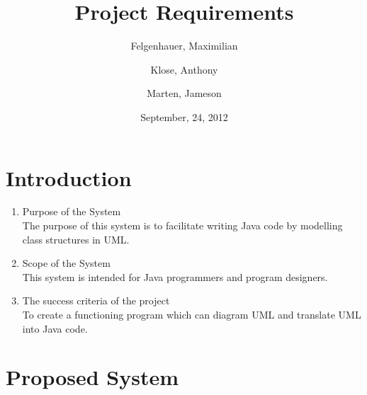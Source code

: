 \documentclass[a4paper, 12pt]{article}
\begin{document}
\title{Project Requirements}
\author{Felgenhauer, Maximilian\\
  \and
  Klose, Anthony\\
  \and
  Marten, Jameson}
\date{September, 24, 2012}

\maketitle

\section{Introduction}

\begin{enumerate}
\item{Purpose of the System}\\
  The purpose of this system is to facilitate writing Java code by modelling class structures in UML.

\item{Scope of the System}\\
  This system is intended for Java programmers and program designers.

\item{The success criteria of the project}\\
  To create a functioning program which can diagram UML and translate UML into Java code.
\end{enumerate}

\section{Proposed System}
\end{document}
